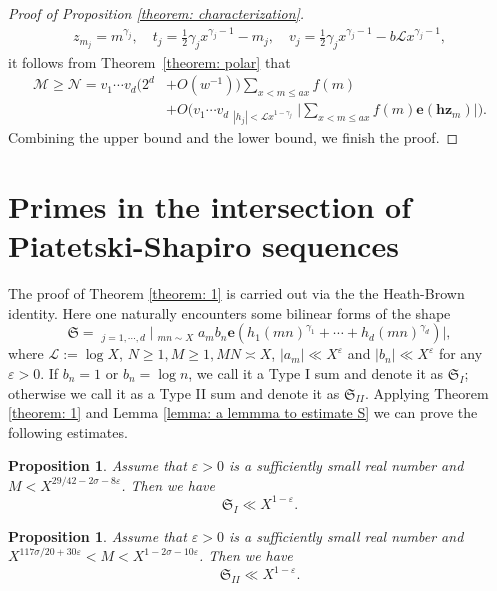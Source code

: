 \documentclass[12pt, reqno, twoside, letterpaper]{amsart}
\numberwithin{equation}{section}
\newcommand{\e}{\ensuremath{\mathbf{e}}}
\newcommand{\cL}{\ensuremath{\mathcal{L}}}
\newcommand{\cM}{\ensuremath{\mathcal{M}}}
\newcommand{\cN}{\ensuremath{\mathcal{N}}}
\theoremstyle{customthm}
\newtheorem{proposition}[X]{Proposition}
\theoremstyle{customrem}
\renewcommand{\ge}{\ensuremath{\geqslant}}
\begin{document}
\begin{proof}[Proof of Proposition \ref{theorem: characterization}]
\begin{align*}
z_{m_{j}} = m^{\gamma_j}, \quad t_j = \frac{1}{2} \gamma_j x^{\gamma_j-1} - m_j, \quad v_j = \frac{1}{2}\gamma_j x^{\gamma_j-1} - b\cL x^{\gamma_j-1},
\end{align*}
it follows from Theorem~\ref{theorem: polar} that
\begin{align*}
\cM \geqslant \cN = v_1\cdots v_d(2^d &+ O(w^{-1}))\sum_{x < m \leqslant ax}f(m)\\
&+O\Bigg(v_1\cdots v_d\mathop{\sum_{\boldsymbol{h}\in\mathbb{Z}^d\setminus\{\boldsymbol{0}\}}}
_{|h_j|<\cL x^{1-\gamma_j}}\Bigg|\sum_{x < m \leqslant ax}f(m)\mathbf{e}(\boldsymbol{h}\boldsymbol{z}_m)
\Bigg|\Bigg).
\end{align*}
Combining the upper bound and the lower bound, we finish the proof.

\end{proof}





\section{Primes in the intersection of Piatetski-Shapiro sequences}
\label{section: intersection P-S primes}

The proof of Theorem \ref{theorem: 1} is carried out
via the the Heath-Brown identity. Here one naturally encounters some bilinear forms
of the shape
$$
\mathfrak{S}=\mathop{\sum_{0<|h_j|<X^{\delta_j}\mathcal{L}}}_{j=1,\cdots,d}
\Bigg|\mathop{{\sum_{m \sim M} \sum_{n \sim N}}}_{mn \sim X} a_m b_n \e \left(
h_1(mn)^{\gamma_1}+\cdots+h_d(mn)^{\gamma_d}\right)\Bigg|,
$$
where $\mathcal{L}:=\log X$,
$N \ge 1, M \ge 1, MN \asymp X$, $|a_m|\ll X^{\varepsilon}$ and $|b_n|\ll X^{\varepsilon}$
for any $\varepsilon>0$. If $b_n=1$ or $b_n=\log n$, we call it a Type I sum and denote it as $\mathfrak{S}_{I}$; otherwise we call it as a Type II sum and denote it as $\mathfrak{S}_{II}$.
Applying Theorem \ref{theorem: 1} and Lemma \ref{lemma: a lemmma to estimate S} we can prove
the following estimates.


\begin{proposition}\label{theorem: Type I} Assume that $\varepsilon>0$ is a
sufficiently small real number and $M<X^{29/42-2\sigma-8\varepsilon}$. Then we have
$$
\mathfrak{S}_{I}\ll X^{1-\varepsilon}.
$$
\end{proposition}

\begin{proposition}\label{theorem: Type II} Assume that $\varepsilon>0$ is a
sufficiently small real number and $X^{117\sigma/20+30\varepsilon} < M < X^{1-2\sigma-10\varepsilon}$.
Then we have
$$
\mathfrak{S}_{II}\ll X^{1-\varepsilon}.
$$
\end{proposition}
\end{document}
